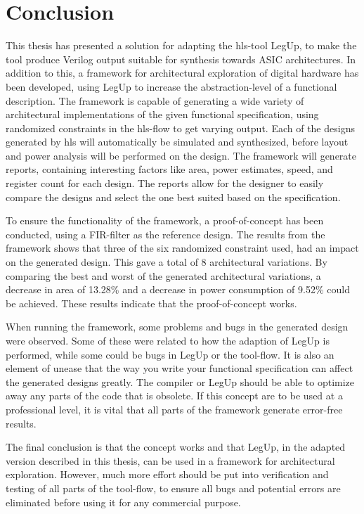 \chapter{Conclusion}
\label{chp:conclusion} 
This thesis has presented a solution for adapting the \gls{hls}-tool LegUp, to make the tool produce Verilog output suitable for synthesis towards ASIC architectures. In addition to this, a framework for architectural exploration of digital hardware has been developed, using LegUp to increase the abstraction-level of a functional description. The framework is capable of generating a wide variety of architectural implementations of the given functional specification, using randomized constraints in the \gls{hls}-flow to get varying output. Each of the designs generated by \gls{hls} will automatically be simulated and synthesized, before layout and power analysis will be performed on the design. The framework will generate reports, containing interesting factors like area, power estimates, speed, and register count for each design. The reports allow for the designer to easily compare the designs and select the one best suited based on the specification.

To ensure the functionality of the framework, a proof-of-concept has been conducted, using a FIR-filter as the reference design. The results from the framework shows that three of the six randomized constraint used, had an impact on the generated design. This gave a total of 8 architectural variations. By comparing the best and worst of the generated architectural variations, a decrease in area of 13.28\% and a decrease in power consumption of 9.52\% could be achieved. These results indicate that the proof-of-concept works.

When running the framework, some problems and bugs in the generated design were observed. Some of these were related to how the adaption of LegUp is performed, while some could be bugs in LegUp or the tool-flow. It is also an element of unease that the way you write your functional specification can affect the generated designs greatly. The compiler or LegUp should be able to optimize away any parts of the code that is obsolete. If this concept are to be used at a professional level, it is vital that all parts of the framework generate error-free results. 

The final conclusion is that the concept works and that LegUp, in the adapted version described in this thesis, can be used in a framework for architectural exploration. However, much more effort should be put into verification and testing of all parts of the tool-flow, to ensure all bugs and potential errors are eliminated before using it for any commercial purpose.
